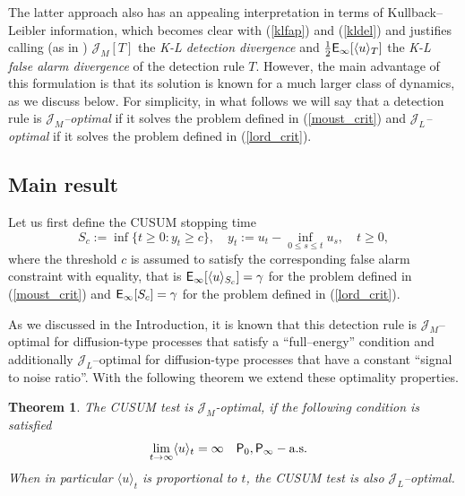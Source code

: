\documentclass[11pt,reqno]{amsart}
\newtheorem{theorem}{Theorem}[section]
\theoremstyle{remark}
\begin{document}
The latter approach also has an appealing interpretation in terms of Kullback--Leibler information, which becomes clear with (\ref{klfap}) and (\ref{kldel}) and  justifies calling (as in \cite{moustito}) ${\mathcal{J}}_{M}[T]$ the \textit{K-L detection divergence} and $\frac{1}{2} {{\sf E}}_{\infty}[\langle u \rangle_{T}]$ the \textit{K-L false alarm divergence} of the detection rule $T$. However, the main advantage of this formulation is that its solution is known for a much larger class of dynamics, as we discuss below. For simplicity, in what follows we will say that a detection rule is ${\mathcal{J}}_{M}$\textit{--optimal} if it solves the problem defined in (\ref{moust_crit}) and ${\mathcal{J}}_{L}$\textit{--optimal} if it solves the problem defined in (\ref{lord_crit}).

 

\subsection{Main result}
Let us first define the CUSUM stopping time
\begin{equation*} 
{S_{c}} := \inf \{t \geq 0: y_{t} \geq c\}, \quad y_{t}:= u_{t}- \inf_{0 \leq s \leq t} u_{s}, \quad t \geq 0,
\end{equation*}
where the threshold $c$ is assumed to satisfy the corresponding false alarm constraint with equality, that is 
${{\sf E}}_{\infty}[\langle u \rangle_{S_{c}}]=\gamma$ for the problem defined in (\ref{moust_crit}) and ${{\sf E}}_{\infty}[{S_{c}}]=\gamma$ for the problem defined in (\ref{lord_crit}).

As we discussed in the Introduction, it is known that this detection rule is ${\mathcal{J}}_{M}$--optimal for diffusion-type processes that satisfy a  ``full--energy'' condition and additionally ${\mathcal{J}}_{L}$--optimal for diffusion-type processes that have a constant ``signal to noise ratio''.  With the following theorem we extend these optimality properties.

\begin{theorem}\label{MAIN} 
The CUSUM test is ${\mathcal{J}}_{M}$-optimal, if the following condition is satisfied
\begin{align}
& \lim_{t \rightarrow   \infty} \langle u \rangle_{t} =\infty  \quad {{\sf P}}_{0}, {{\sf P}}_{\infty}-\text{a.s.}  \label{full}
\end{align}
When in particular  $\langle u \rangle_{t}$ is proportional to $t$, the CUSUM test is also ${\mathcal{J}}_{L}$--optimal. 
\end{theorem}
\end{document}
